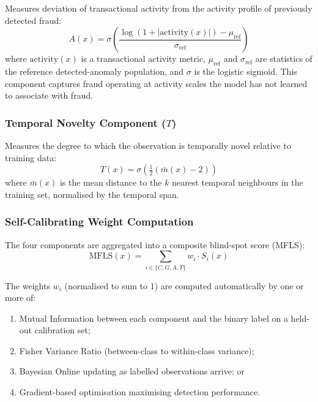 \documentclass[12pt,a4paper]{article}
\begin{document}
Measures deviation of transactional activity from the activity profile of
previously detected fraud:
\begin{equation}
A(x) = \sigma\!\left(
\frac{\log(1+|\mathrm{activity}(x)|)-\mu_{\mathrm{ref}}}
{\sigma_{\mathrm{ref}}}\right)
\end{equation}
where $\mathrm{activity}(x)$ is a transactional activity metric,
$\mu_{\mathrm{ref}}$ and $\sigma_{\mathrm{ref}}$ are statistics of the
reference detected-anomaly population, and $\sigma$ is the logistic
sigmoid. This component captures fraud operating at activity scales the
model has not learned to associate with fraud.

\subsubsection{Temporal Novelty Component ($T$)}

Measures the degree to which the observation is temporally novel relative
to training data:
\begin{equation}
T(x) = \sigma\!\left(\tfrac{1}{2}(\bar{m}(x)-2)\right)
\end{equation}
where $\bar{m}(x)$ is the mean distance to the $k$ nearest temporal
neighbours in the training set, normalised by the temporal span.

\subsubsection{Self-Calibrating Weight Computation}

The four components are aggregated into a composite blind-spot score (MFLS):
\begin{equation}
\mathrm{MFLS}(x) = \sum_{i\in\{C,G,A,T\}} w_i\cdot S_i(x)
\end{equation}

The weights $w_i$ (normalised to sum to 1) are computed automatically by
one or more of:
\begin{enumerate}[label=(\alph*)]
\item Mutual Information between each component and the binary label on a
held-out calibration set;
\item Fisher Variance Ratio (between-class to within-class variance);
\item Bayesian Online updating as labelled observations arrive; or
\item Gradient-based optimisation maximising detection performance.
\end{enumerate}
\end{document}
